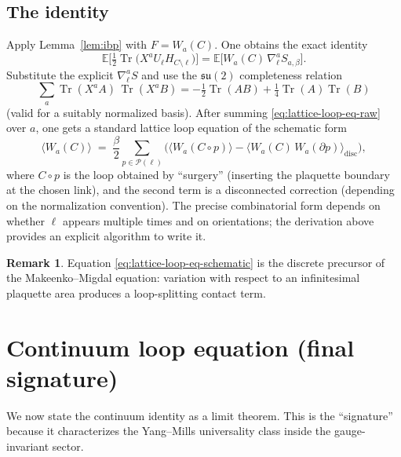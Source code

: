 \documentclass[11pt]{article}
\theoremstyle{definition}
\newtheorem{remark}[theorem]{Remark}
\newcommand{\1}{\mathbf{1}}
\newcommand{\Tr}{\operatorname{Tr}}
\begin{document}
\subsection{The identity}

Apply Lemma~\ref{lem:ibp} with $F=W_a(C)$. One obtains the exact identity
\begin{equation}
\label{eq:lattice-loop-eq-raw}
\mathbb E\Big[\tfrac12\Tr\big(X^a U_\ell H_{C\setminus \ell}\big)\Big]
=\mathbb E\Big[W_a(C)\,\nabla^{a}_{\ell}S_{a,\beta}\Big].
\end{equation}
Substitute the explicit $\nabla^{a}_{\ell}S$ and use the $\mathfrak{su}(2)$ completeness relation
\begin{equation}
\sum_a \Tr(X^a A)\,\Tr(X^a B)= -\tfrac12\Tr(AB)+\tfrac14\Tr(A)\Tr(B)
\end{equation}
(valid for a suitably normalized basis). After summing \eqref{eq:lattice-loop-eq-raw} over $a$, one gets a standard lattice loop equation of the schematic form
\begin{equation}
\label{eq:lattice-loop-eq-schematic}
\langle W_a(C)\rangle
\;=\;\frac{\beta}{2}\sum_{p\in\mathcal P(\ell)}\Big(\langle W_a(C\circ p)\rangle - \langle W_a(C)\,W_a(\partial p)\rangle_{\mathrm{disc}}\Big),
\end{equation}
where $C\circ p$ is the loop obtained by ``surgery'' (inserting the plaquette boundary at the chosen link), and the second term is a disconnected correction (depending on the normalization convention). The precise combinatorial form depends on whether $\ell$ appears multiple times and on orientations; the derivation above provides an explicit algorithm to write it.

\begin{remark}
Equation \eqref{eq:lattice-loop-eq-schematic} is the discrete precursor of the Makeenko--Migdal equation: variation with respect to an infinitesimal plaquette area produces a loop-splitting contact term.
\end{remark}

\section{Continuum loop equation (final signature)}

We now state the continuum identity as a limit theorem. This is the ``signature'' because it characterizes the Yang--Mills universality class inside the gauge-invariant sector.
\end{document}
